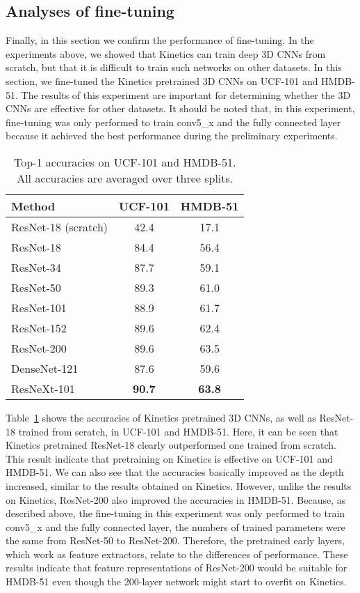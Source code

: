 \documentclass[10pt,twocolumn,letterpaper]{article}
\begin{document}
  \subsection{Analyses of fine-tuning}\label{sec:exp_ft}
    Finally, in this section we confirm the performance of fine-tuning.
    In the experiments above, we showed that Kinetics can train deep 3D CNNs from scratch,
    but that it is difficult to train such networks on other datasets.
    In this section, we fine-tuned the Kinetics pretrained 3D CNNs on UCF-101 and HMDB-51.
    The results of this experiment are important for determining whether the 3D CNNs are effective for other datasets.
    It should be noted that, in this experiment, fine-tuning was only performed to train conv5\_x and the fully connected layer
    because it achieved the best performance during the preliminary experiments.

    \begin{table}[t]
      \centering
      \caption{
        Top-1 accuracies on UCF-101 and HMDB-51.
        All accuracies are averaged over three splits.
      }\label{tbl:ucf101_hmdb51}
      \begin{tabular}{lcc}
        \toprule
        Method & UCF-101 & HMDB-51 \\
        \midrule
        ResNet-18 (scratch) & 42.4 & 17.1 \\
        \midrule
        ResNet-18 & 84.4 & 56.4 \\
        ResNet-34 & 87.7 & 59.1 \\
        ResNet-50 & 89.3 & 61.0 \\
        ResNet-101 & 88.9 & 61.7 \\
        ResNet-152 & 89.6 & 62.4 \\
        ResNet-200 & 89.6 & 63.5 \\
        \midrule
        DenseNet-121 & 87.6 & 59.6 \\
        ResNeXt-101 & \textbf{90.7} & \textbf{63.8} \\
        \bottomrule
      \end{tabular}
    \end{table}
    Table~\ref{tbl:ucf101_hmdb51} shows the accuracies of Kinetics pretrained 3D CNNs,
    as well as ResNet-18 trained from scratch, in UCF-101 and HMDB-51.
    Here, it can be seen that Kinetics pretrained ResNet-18 clearly outperformed one trained from scratch.
    This result indicate that pretraining on Kinetics is effective on UCF-101 and HMDB-51.
    We can also see that the accuracies basically improved as the depth increased,
    similar to the results obtained on Kinetics.
    However, unlike the results on Kinetics, ResNet-200 also improved the accuracies in HMDB-51.
    Because, as described above, the fine-tuning in this experiment
    was only performed to train conv5\_x and the fully connected layer,
    the numbers of trained parameters were the same from ResNet-50 to ResNet-200.
    Therefore, the pretrained early layers, which work as feature extractors,
    relate to the differences of performance.
    These results indicate that feature representations of ResNet-200 would be suitable for HMDB-51
    even though the 200-layer network might start to overfit on Kinetics.
\end{document}
